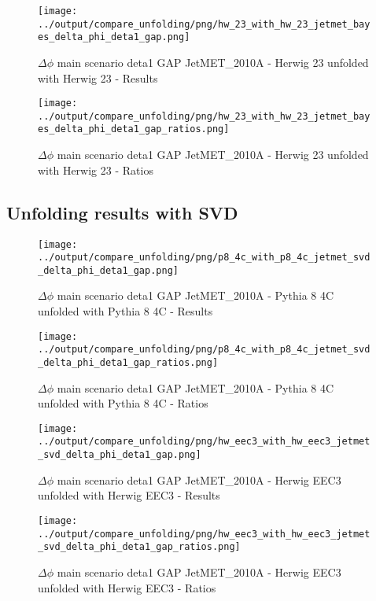 \documentclass[11pt]{book}
\begin{document}
\begin{figure}[ht]
\centering
\texttt{[image: ../output/compare\_unfolding/png/hw\_23\_with\_hw\_23\_jetmet\_bayes\_delta\_phi\_deta1\_gap.png]}
\caption{$\Delta\phi$ main scenario deta1 GAP JetMET\_2010A - Herwig 23 unfolded with Herwig 23 - Results}
\label{hw_23_hw_23_jetmet_bayes_delta_phi_deta1_gap_a}
\end{figure}

\begin{figure}[ht]
\centering
\texttt{[image: ../output/compare\_unfolding/png/hw\_23\_with\_hw\_23\_jetmet\_bayes\_delta\_phi\_deta1\_gap\_ratios.png]}
\caption{$\Delta\phi$ main scenario deta1 GAP JetMET\_2010A - Herwig 23 unfolded with Herwig 23 - Ratios}
\label{hw_23_hw_23_jetmet_bayes_delta_phi_deta1_gap_b}
\end{figure}


\clearpage
\subsection{Unfolding results with SVD}

\begin{figure}[ht]
\centering
\texttt{[image: ../output/compare\_unfolding/png/p8\_4c\_with\_p8\_4c\_jetmet\_svd\_delta\_phi\_deta1\_gap.png]}
\caption{$\Delta\phi$ main scenario deta1 GAP JetMET\_2010A - Pythia 8 4C unfolded with Pythia 8 4C - Results}
\label{p8_p8_jetmet_svd_delta_phi_deta1_gap_a}
\end{figure}

\begin{figure}[ht]
\centering
\texttt{[image: ../output/compare\_unfolding/png/p8\_4c\_with\_p8\_4c\_jetmet\_svd\_delta\_phi\_deta1\_gap\_ratios.png]}
\caption{$\Delta\phi$ main scenario deta1 GAP JetMET\_2010A - Pythia 8 4C unfolded with Pythia 8 4C - Ratios}
\label{p8_p8_jetmet_svd_delta_phi_deta1_gap_b}
\end{figure}

\begin{figure}[ht]
\centering
\texttt{[image: ../output/compare\_unfolding/png/hw\_eec3\_with\_hw\_eec3\_jetmet\_svd\_delta\_phi\_deta1\_gap.png]}
\caption{$\Delta\phi$ main scenario deta1 GAP JetMET\_2010A - Herwig EEC3 unfolded with Herwig EEC3 - Results}
\label{hw_eec3_hw_eec3_jetmet_svd_delta_phi_deta1_gap_a}
\end{figure}

\begin{figure}[ht]
\centering
\texttt{[image: ../output/compare\_unfolding/png/hw\_eec3\_with\_hw\_eec3\_jetmet\_svd\_delta\_phi\_deta1\_gap\_ratios.png]}
\caption{$\Delta\phi$ main scenario deta1 GAP JetMET\_2010A - Herwig EEC3 unfolded with Herwig EEC3 - Ratios}
\label{hw_eec3_hw_eec3_jetmet_svd_delta_phi_deta1_gap_b}
\end{figure}
\end{document}
